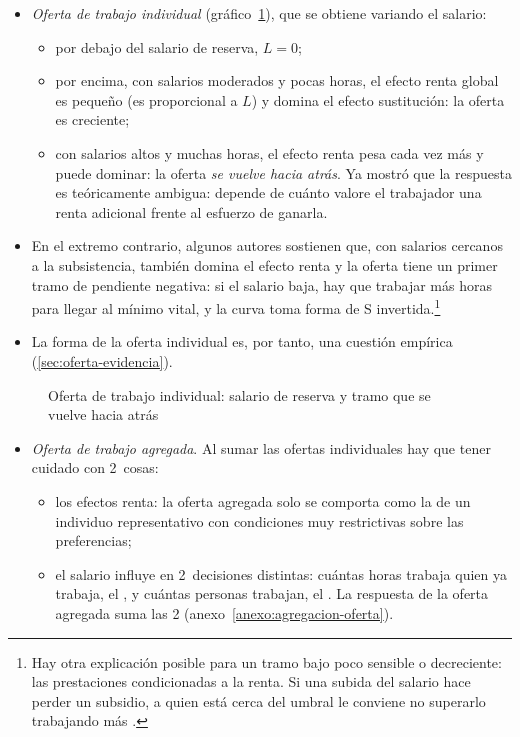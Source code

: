 \documentclass[11pt]{article}
\begin{document}
\begin{itemize}
\item \emph{Oferta de trabajo individual} (gráfico~\ref{fig:oferta-individual}), que se obtiene variando el salario:
  \begin{itemize}
  \item por debajo del salario de reserva, $L=0$;
  \item por encima, con salarios moderados y pocas horas, el efecto renta global es pequeño (es proporcional a $L$) y domina el efecto sustitución: la oferta es creciente;
  \item con salarios altos y muchas horas, el efecto renta pesa cada vez más y puede dominar: la oferta \emph{se vuelve hacia atrás}. Ya \textcite{Robbins1930Elasticity} mostró que la respuesta es teóricamente ambigua: depende de cuánto valore el trabajador una renta adicional frente al esfuerzo de ganarla.
  \end{itemize}
\item En el extremo contrario, algunos autores sostienen que, con salarios cercanos a la subsistencia, también domina el efecto renta y la oferta tiene un primer tramo de pendiente negativa: si el salario baja, hay que trabajar más horas para llegar al mínimo vital, y la curva toma forma de S invertida\nocite{Sharif2000Inverted,Dessing2002Labor}.\footnote{Hay otra explicación posible para un tramo bajo poco sensible o decreciente: las prestaciones condicionadas a la renta. Si una subida del salario hace perder un subsidio, a quien está cerca del umbral le conviene no superarlo trabajando más .}
\item La forma de la oferta individual es, por tanto, una cuestión empírica (\ref{sec:oferta-evidencia}).
\end{itemize}

\begin{figure}[H]
\centering
\caption{Oferta de trabajo individual: salario de reserva y tramo que se vuelve hacia atrás}\label{fig:oferta-individual}
\end{figure}

\begin{itemize}
\item \emph{Oferta de trabajo agregada}. Al sumar las ofertas individuales hay que tener cuidado con 2~cosas:
  \begin{itemize}
  \item los efectos renta: la oferta agregada solo se comporta como la de un individuo representativo con condiciones muy restrictivas sobre las preferencias\nocite{Gorman1953Community,Kirman1992Whom};
  \item el salario influye en 2~decisiones distintas: cuántas horas trabaja quien ya trabaja, el , y cuántas personas trabajan, el . La respuesta de la oferta agregada suma las 2 (anexo~\ref{anexo:agregacion-oferta}).
  \end{itemize}
\end{itemize}
\end{document}
